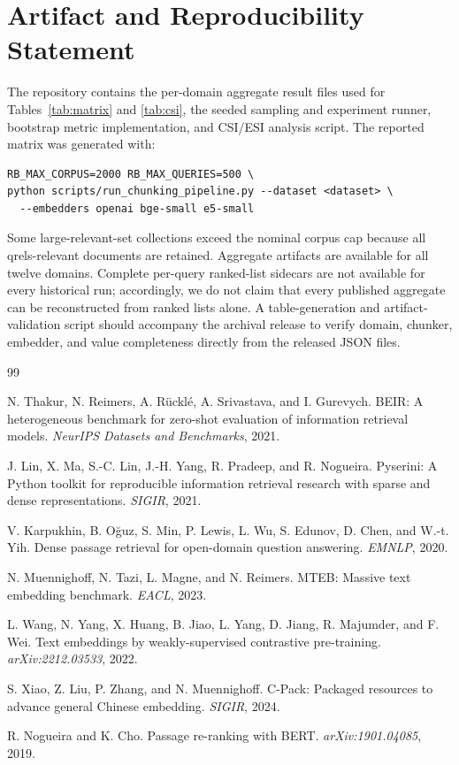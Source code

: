 \documentclass[10pt,letterpaper]{article}
\begin{document}
\section*{Artifact and Reproducibility Statement}

The repository contains the per-domain aggregate result files used for Tables~\ref{tab:matrix} and
\ref{tab:csi}, the seeded sampling and experiment runner, bootstrap metric implementation, and
CSI/ESI analysis script. The reported matrix was generated with:
\begin{verbatim}
RB_MAX_CORPUS=2000 RB_MAX_QUERIES=500 \
python scripts/run_chunking_pipeline.py --dataset <dataset> \
  --embedders openai bge-small e5-small
\end{verbatim}
Some large-relevant-set collections exceed the nominal corpus cap because all qrels-relevant
documents are retained. Aggregate artifacts are available for all twelve domains. Complete
per-query ranked-list sidecars are not available for every historical run; accordingly, we do not
claim that every published aggregate can be reconstructed from ranked lists alone. A table-generation
and artifact-validation script should accompany the archival release to verify domain, chunker,
embedder, and value completeness directly from the released JSON files.

\begin{thebibliography}{99}

N. Thakur, N. Reimers, A. R\"uckl\'e, A. Srivastava, and I. Gurevych.
BEIR: A heterogeneous benchmark for zero-shot evaluation of information retrieval models.
\emph{NeurIPS Datasets and Benchmarks}, 2021.

J. Lin, X. Ma, S.-C. Lin, J.-H. Yang, R. Pradeep, and R. Nogueira.
Pyserini: A Python toolkit for reproducible information retrieval research with sparse and dense
representations. \emph{SIGIR}, 2021.

V. Karpukhin, B. O\u{g}uz, S. Min, P. Lewis, L. Wu, S. Edunov, D. Chen, and W.-t. Yih.
Dense passage retrieval for open-domain question answering. \emph{EMNLP}, 2020.

\bibitem{muennighoff2023mteb}
N. Muennighoff, N. Tazi, L. Magne, and N. Reimers.
MTEB: Massive text embedding benchmark. \emph{EACL}, 2023.

L. Wang, N. Yang, X. Huang, B. Jiao, L. Yang, D. Jiang, R. Majumder, and F. Wei.
Text embeddings by weakly-supervised contrastive pre-training.
\emph{arXiv:2212.03533}, 2022.

S. Xiao, Z. Liu, P. Zhang, and N. Muennighoff.
C-Pack: Packaged resources to advance general Chinese embedding.
\emph{SIGIR}, 2024.

R. Nogueira and K. Cho.
Passage re-ranking with BERT. \emph{arXiv:1901.04085}, 2019.

\end{thebibliography}
\end{document}
